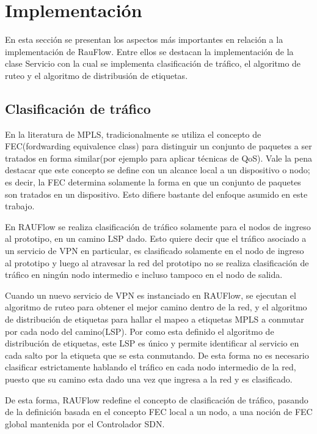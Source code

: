 \section[Implementaci\'on]{Implementaci\'on}

En esta secci\'on se presentan los aspectos m\'as importantes en relaci\'on a la implementaci\'on de RauFlow. Entre ellos se destacan la implementaci\'on de la clase Servicio con la cual se implementa  clasificaci\'on de tr\'afico, el algoritmo de ruteo y el algoritmo de distribusi\'on de etiquetas.\\

\subsection{Clasificación de tr\'afico}
En la literatura de MPLS, tradicionalmente se utiliza el concepto de FEC(fordwarding equivalence class) para distinguir un conjunto de paquetes a ser tratados en forma similar(por ejemplo para aplicar t\'ecnicas de QoS). Vale la pena destacar que este concepto se define con un alcance local a un dispositivo o nodo; es decir, la FEC determina solamente la forma en que un conjunto de paquetes son tratados en un dispositivo. Esto difiere bastante del enfoque asumido en este trabajo.

En RAUFlow se realiza clasificaci\'on de tr\'afico solamente para el nodos de ingreso al prototipo, en un camino LSP dado. Esto quiere decir que el tr\'afico asociado a un servicio de VPN en particular, es clasificado solamente en el nodo de ingreso al prototipo y luego al atravesar la red del prototipo no se realiza clasificaci\'on de tr\'afico en ningún nodo intermedio e incluso tampoco en el nodo de salida.

Cuando un nuevo servicio de VPN es instanciado en RAUFlow, se ejecutan el algoritmo de ruteo para obtener el mejor camino dentro de la red, y el algoritmo de distribución de etiquetas para hallar el mapeo a etiquetas MPLS a conmutar por cada nodo del camino(LSP). Por como esta definido el algoritmo de distribución de etiquetas, este LSP es \'unico y permite identificar al servicio en cada salto por la etiqueta que se esta conmutando. De esta forma no es necesario clasificar estrictamente hablando el tr\'afico en cada nodo intermedio de la red, puesto que su camino esta dado una vez que ingresa a la red y es clasificado.

De esta forma, RAUFlow redefine el concepto de clasificaci\'on de tr\'afico, pasando de la definici\'on basada en el concepto FEC local a un nodo, a una noci\'on de FEC global mantenida por el Controlador SDN.\\

